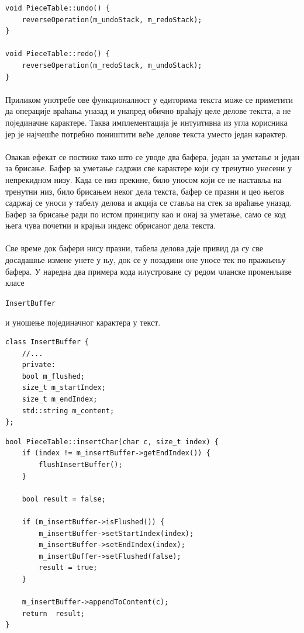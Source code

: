 \documentclass[12pt,oneside]{memoir}
\begin{document}
\begin{verbatim}
void PieceTable::undo() {
	reverseOperation(m_undoStack, m_redoStack);
}

void PieceTable::redo() {
	reverseOperation(m_redoStack, m_undoStack);
}
\end{verbatim}

\paragraph{}
Приликом употребе ове функционалност у едиторима текста може се приметити да 
операције враћања уназад и унапред обично враћају целе делове текста, а не појединачне карактере. Таква имплементација је интуитивна из угла корисника јер
је најчешће потребно поништити веће делове текста уместо један карактер.

\paragraph{}
Овакав ефекат се постиже тако што се уводе два бафера, један за уметање и један
за брисање. Бафер за уметање садржи све карактере који су тренутно унесени у 
непрекидном низу. Када се низ прекине, било уносом који се не наставља на тренутни
низ, било брисањем неког дела текста, бафер се празни и цео његов садржај се уноси
у табелу делова и акција се ставља на стек за враћање уназад. 
Бафер за брисање ради по истом принципу као и онај за уметање, само се код њега
чува почетни и крајњи индекс обрисаног дела текста.

\paragraph{}
Све време док бафери нису празни, табела делова даје привид да су све досадашње
измене унете у њу, док се у позадини оне уносе тек по пражњењу бафера. У наредна
два примера кода илустроване су редом чланске променљиве класе \begin{latinica}
\verb|InsertBuffer|\end{latinica} и уношење појединачног карактера у текст.

\begin{verbatim}
class InsertBuffer {
	//...
	private:
	bool m_flushed;
	size_t m_startIndex;
	size_t m_endIndex;
	std::string m_content;
};
\end{verbatim}

\begin{verbatim}
bool PieceTable::insertChar(char c, size_t index) {
	if (index != m_insertBuffer->getEndIndex()) {
		flushInsertBuffer();
	}
	
	bool result = false;
	
	if (m_insertBuffer->isFlushed()) {
		m_insertBuffer->setStartIndex(index);
		m_insertBuffer->setEndIndex(index);
		m_insertBuffer->setFlushed(false);
		result = true;
	}
	
	m_insertBuffer->appendToContent(c);
	return  result;
}
\end{verbatim}
\end{document}
